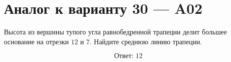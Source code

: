 


\section*{Аналог к варианту 30 — A02}
Высота из вершины тупого угла равнобедренной трапеции делит большее основание на отрезки \(12\) и \(7\). Найдите среднюю линию трапеции.
\begin{center}\figIsoscelesTrapezoid\end{center}
\[\boxed{\text{Ответ: }12}\]

